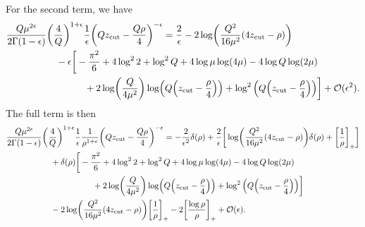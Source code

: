 \documentclass[11pt,twoside,reqno]{amsart}
\theoremstyle{plain}
\theoremstyle{remark}
\theoremstyle{definition}
\theoremstyle{remark}
\theoremstyle{definition}
\theoremstyle{definition}
\newcommand{\cO}{\mathcal{O}}
\newcommand{\zcut}{z_\mathrm{cut}}
\begin{document}
	For the second term, we have
	\begin{equation}
	\begin{aligned}
		\frac{Q \mu^{2\epsilon}}{2\Gamma(1 - \epsilon)} &\qty(\frac{4}{Q})^{1 + \epsilon} \frac{1}{\epsilon} \qty(Q \zcut - \frac{Q\rho}{4})^{-\epsilon} = \frac{2}{\epsilon} - 2\log(\frac{Q^2}{16\mu^2}(4\zcut - \rho)) \\
			&\quad - \epsilon \bigg[ -\frac{\pi^2}{6} + 4\log^2 2 + \log^2 Q + 4\log \mu \log(4\mu) - 4\log Q \log (2\mu) \\
			&\qquad\qquad + 2\log(\frac{Q}{4\mu^2})\log(Q\qty(\zcut - \frac{\rho}{4})) + \log^2\qty(Q\qty(\zcut - \frac{\rho}{4})) \bigg] + \cO(\epsilon^2).
	\end{aligned}
	\end{equation}
	The full term is then
	\begin{equation}
	\begin{aligned}
		\frac{Q \mu^{2\epsilon}}{2\Gamma(1 - \epsilon)} &\qty(\frac{4}{Q})^{1 + \epsilon} \frac{1}{\epsilon} \frac{1}{\rho^{1+\epsilon}} \qty(Q \zcut - \frac{Q\rho}{4})^{-\epsilon} = -\frac{2}{\epsilon^2}\delta(\rho) + \frac{2}{\epsilon}\bigg[\log(\frac{Q^2}{16\mu^2}\qty(4\zcut - \rho)) \delta(\rho) + \qty[\frac{1}{\rho}]_+ \bigg] \\
			&\quad+ \delta(\rho)\bigg[ -\frac{\pi^2}{6} + 4\log^2 2 + \log^2 Q + 4\log \mu \log(4\mu) - 4\log Q \log (2\mu) \\
			&\qquad\qquad\qquad + 2\log(\frac{Q}{4\mu^2})\log(Q\qty(\zcut - \frac{\rho}{4})) + \log^2\qty(Q\qty(\zcut - \frac{\rho}{4})) \bigg] \\
			&\quad- 2\log(\frac{Q^2}{16\mu^2}(4\zcut - \rho))\qty[\frac{1}{\rho}]_+ - 2\qty[\frac{\log \rho}{\rho}]_+ + \cO(\epsilon).
	\end{aligned}
	\end{equation}
\end{document}

